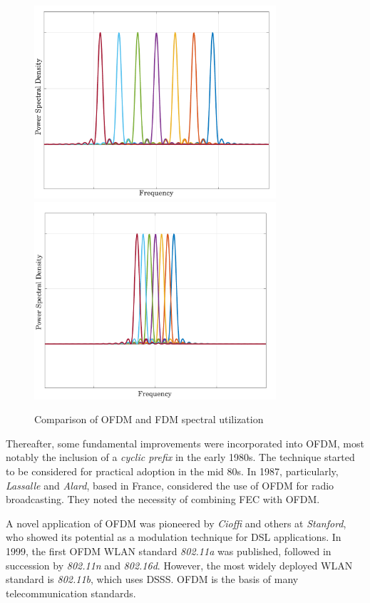 \begin{figure}[!ht]
	\centering
	\includegraphics[width=0.8\textwidth]{Graphics/LiteratureReview/fdm.pdf}
	\includegraphics[width=0.8\textwidth]{Graphics/LiteratureReview/ofdmPSD.pdf}
	\caption{Comparison of OFDM and FDM spectral utilization}
	\label{fig:litRev:fdm}
\end{figure}

Thereafter, some fundamental improvements were incorporated into OFDM, most notably the inclusion of a \emph{cyclic prefix} in the early 1980s. The technique started to be considered for practical adoption in the mid 80s. In 1987, particularly, \emph{Lassalle} and \emph{Alard}, based in France, considered the use of OFDM for radio broadcasting. They noted the necessity of combining \gls{FEC} with \gls{OFDM}.

A novel application of OFDM was pioneered by \emph{Cioffi} and others at \emph{Stanford}, who showed its potential as a modulation technique for \gls{DSL} applications. In 1999, the first OFDM \gls{WLAN} standard \emph{802.11a} was published, followed in succession by \emph{802.11n} and \emph{802.16d}. However, the most widely deployed \gls{WLAN} standard is \emph{802.11b}, which uses \gls{DSSS}. OFDM is the basis of many telecommunication standards.

